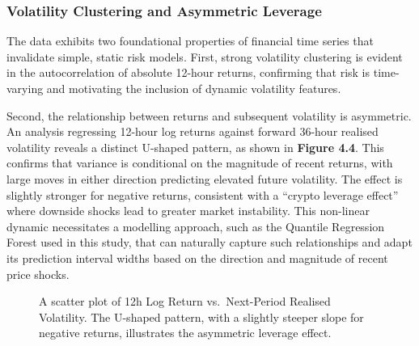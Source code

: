 \documentclass[
  a4paper,
  DIV=11,
  numbers=noendperiod]{scrreprt}
\begin{document}
\subsubsection{Volatility Clustering and Asymmetric
Leverage}\label{volatility-clustering-and-asymmetric-leverage}

The data exhibits two foundational properties of financial time series
that invalidate simple, static risk models. First, strong volatility
clustering is evident in the autocorrelation of absolute 12-hour
returns, confirming that risk is time-varying and motivating the
inclusion of dynamic volatility features.

Second, the relationship between returns and subsequent volatility is
asymmetric. An analysis regressing 12-hour log returns against forward
36-hour realised volatility reveals a distinct U-shaped pattern, as
shown in \textbf{Figure 4.4}. This confirms that variance is conditional
on the magnitude of recent returns, with large moves in either direction
predicting elevated future volatility. The effect is slightly stronger
for negative returns, consistent with a ``crypto leverage effect'' where
downside shocks lead to greater market instability. This non-linear
dynamic necessitates a modelling approach, such as the Quantile
Regression Forest used in this study, that can naturally capture such
relationships and adapt its prediction interval widths based on the
direction and magnitude of recent price shocks.

\begin{figure}


\caption{\label{fig-leverage-effect}A scatter plot of 12h Log Return
vs.~Next-Period Realised Volatility. The U-shaped pattern, with a
slightly steeper slope for negative returns, illustrates the asymmetric
leverage effect.}

\end{figure}%
\end{document}
